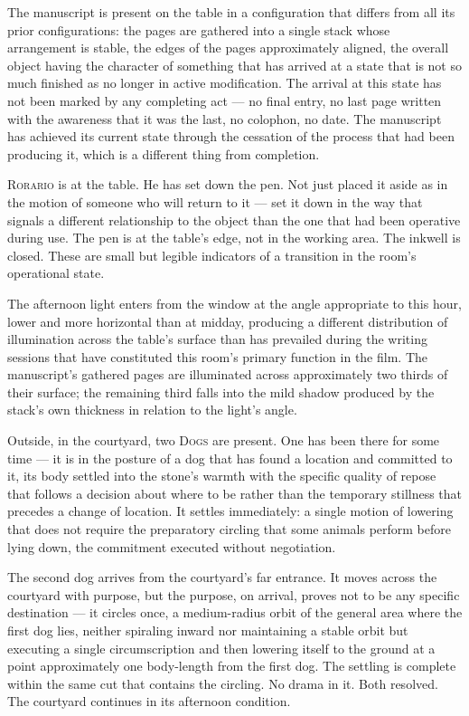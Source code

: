 \documentclass[12pt, oneside]{article}
\newenvironment{action}{%
  \vspace{0.6em}%
  \noindent\ignorespaces%
}{%
  \par\vspace{0.6em}%
}
\begin{document}
\begin{action}
The manuscript is present on the table in a configuration that differs from all its prior configurations: the pages are gathered into a single stack whose arrangement is stable, the edges of the pages approximately aligned, the overall object having the character of something that has arrived at a state that is not so much finished as no longer in active modification. The arrival at this state has not been marked by any completing act --- no final entry, no last page written with the awareness that it was the last, no colophon, no date. The manuscript has achieved its current state through the cessation of the process that had been producing it, which is a different thing from completion.

\textsc{Rorario} is at the table. He has set down the pen. Not just placed it aside as in the motion of someone who will return to it --- set it down in the way that signals a different relationship to the object than the one that had been operative during use. The pen is at the table's edge, not in the working area. The inkwell is closed. These are small but legible indicators of a transition in the room's operational state.
\end{action}

\begin{action}
The afternoon light enters from the window at the angle appropriate to this hour, lower and more horizontal than at midday, producing a different distribution of illumination across the table's surface than has prevailed during the writing sessions that have constituted this room's primary function in the film. The manuscript's gathered pages are illuminated across approximately two thirds of their surface; the remaining third falls into the mild shadow produced by the stack's own thickness in relation to the light's angle.

Outside, in the courtyard, two \textsc{Dogs} are present. One has been there for some time --- it is in the posture of a dog that has found a location and committed to it, its body settled into the stone's warmth with the specific quality of repose that follows a decision about where to be rather than the temporary stillness that precedes a change of location. It settles immediately: a single motion of lowering that does not require the preparatory circling that some animals perform before lying down, the commitment executed without negotiation.

The second dog arrives from the courtyard's far entrance. It moves across the courtyard with purpose, but the purpose, on arrival, proves not to be any specific destination --- it circles once, a medium-radius orbit of the general area where the first dog lies, neither spiraling inward nor maintaining a stable orbit but executing a single circumscription and then lowering itself to the ground at a point approximately one body-length from the first dog. The settling is complete within the same cut that contains the circling. No drama in it. Both resolved. The courtyard continues in its afternoon condition.
\end{action}
\end{document}
